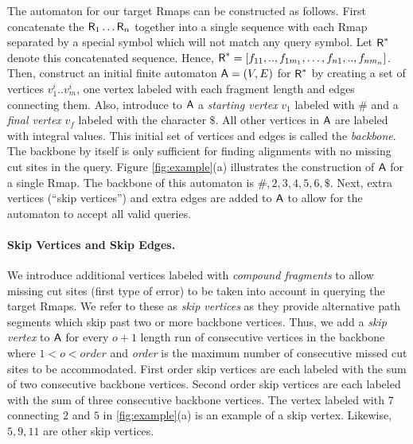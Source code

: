 The automaton for our target Rmaps can be constructed as follows.  First concatenate the $\mbox{\rm {\sf R}}_1 \ldots \mbox{\rm {\sf R}}_n$ together into a single sequence with each Rmap separated by  a special symbol which will not match any query symbol. Let $\mbox{\rm {\sf R}}^*$ denote this concatenated sequence. Hence, $\mbox{\rm {\sf R}}^* = [f_{11},..,f_{1m_1}, \ldots, f_{n1},..,f_{nm_n}]$.  Then, construct an initial finite automaton $\mathsf{A} = (V, E)$ for $\mbox{\rm {\sf R}}^*$ by creating a set of vertices $v^i_1 .. v^i_m$, one vertex labeled with each fragment length and edges connecting them.%
Also, introduce to $\mathsf{A}$  a {\em starting vertex} $v_1$ labeled with $\#$ and a {\em final vertex} $v_f$ labeled with the character $\$$.  All other vertices in $\mathsf{A}$ are labeled with integral values.  This initial set of vertices and edges is called the {\em backbone}.  The backbone by itself is only sufficient for finding alignments with no missing cut sites in the query. Figure \ref{fig:example}(a) illustrates the construction of $\mathsf{A}$ for a single Rmap.  The backbone of this automaton is $\#, 2, 3, 4, 5, 6, \$$.  Next, extra vertices (``skip vertices'') and extra edges are added to $\mathsf{A}$ to allow for the automaton to accept all valid queries.  

\paragraph{Skip Vertices and Skip Edges.}
We introduce additional vertices labeled with {\em compound fragments} to allow missing cut sites (first type of error) to be taken into account in querying the target Rmaps.  We refer to these as {\em skip vertices} as they provide alternative path segments which skip past two or more backbone vertices. Thus, we add a {\em skip vertex} to $\mathsf{A}$ for every $o+1$ length run of consecutive vertices in the backbone where $1 < o < order$ and  \emph{order} is the maximum number of consecutive missed cut sites to be accommodated.  First order skip vertices are each labeled with the sum of two consecutive backbone vertices.  Second order skip vertices are each labeled with the sum of three consecutive backbone vertices. The vertex labeled with $7$ connecting $2$ and $5$ in \ref{fig:example}(a) is an example of a skip vertex.  Likewise, $5, 9, 11$ are other skip vertices.



